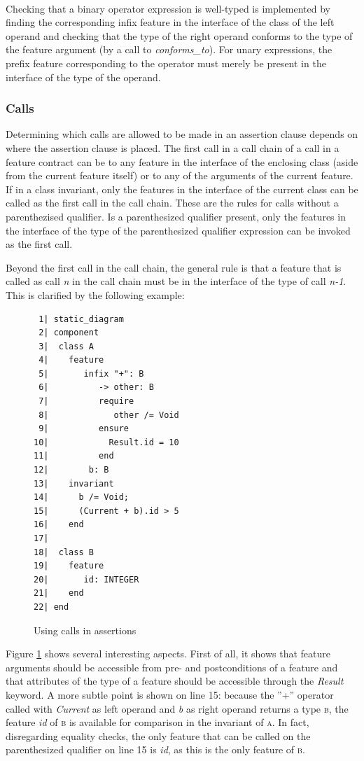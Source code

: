 \paragraph{}
Checking that a binary operator expression is well-typed is implemented by finding the corresponding infix feature in the interface of the class of the left operand and checking that the type of the right operand conforms to the type of the feature argument (by a call to \textit{conforms\_to}). For unary expressions, the prefix feature corresponding to the operator must merely be present in the interface of the type of the operand. 
\subsubsection{Calls}
Determining which calls are allowed to be made in an assertion clause depends on where the assertion clause is placed. The first call in a call chain of a call in a feature contract can be to any feature in the interface of the enclosing class (aside from the current feature itself) or to any of the arguments of the current feature. If in a class invariant, only the features in the interface of the current class can be called as the first call in the call chain. These are the rules for calls without a parenthezised qualifier. Is a parenthesized qualifier present, only the features in the interface of the type of the parenthesized qualifier expression can be invoked as the first call.

Beyond the first call in the call chain, the general rule is that a feature that is called as call \textit{n} in the call chain must be in the interface of the type of call \textit{n-1}. This is clarified by the following example:
\begin{figure}[H]
{\footnotesize
\begin{verbatim}
 1| static_diagram
 2| component
 3|  class A
 4|    feature
 5|       infix "+": B
 6|          -> other: B
 7|          require
 8|             other /= Void
 9|          ensure
10|            Result.id = 10
11|          end
12|        b: B
13|    invariant
14|      b /= Void;
15|      (Current + b).id > 5
16|    end
17|  
18|  class B
19|    feature
20|       id: INTEGER
21|    end
22| end
\end{verbatim}
}
\caption{Using calls in assertions}
\label{fig:call_assertions}
\end{figure}
Figure \ref{fig:call_assertions} shows several interesting aspects. First of all, it shows that feature arguments should be accessible from pre- and postconditions of a feature and that attributes of the type of a feature should be accessible through the \textit{Result} keyword. A more subtle point is shown on line 15: because the ''+'' operator called with \textit{Current} as left operand and \textit{b} as right operand returns a type \textsc{b}, the feature \textit{id} of \textsc{b} is available for comparison in the invariant of \textsc{a}. In fact, disregarding equality checks, the only feature that can be called on the parenthesized qualifier on line 15 is \textit{id}, as this is the only feature of \textsc{b}.

